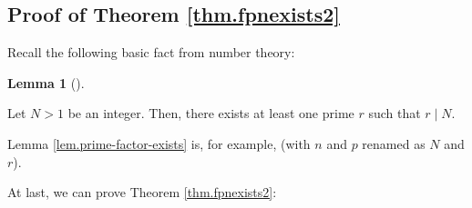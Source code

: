 \documentclass[numbers=enddot,12pt,final,onecolumn,notitlepage]{scrartcl}%
\theoremstyle{definition}
\newtheorem{lem}[theo]{Lemma}
\newenvironment{lemma}[1][]
{\begin{lem}[#1]\begin{leftbar}}
{\end{leftbar}\end{lem}}
\begin{document}
\subsection{Proof of Theorem \ref{thm.fpnexists2}}

Recall the following basic fact from number theory:

\begin{lemma}
\label{lem.prime-factor-exists}Let $N>1$ be an integer. Then, there exists at
least one prime $r$ such that $r\mid N$.
\end{lemma}

Lemma \ref{lem.prime-factor-exists} is, for example, \cite[Proposition
2.13.8]{19s} (with $n$ and $p$ renamed as $N$ and $r$).

At last, we can prove Theorem \ref{thm.fpnexists2}:
\end{document}
